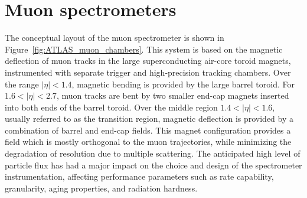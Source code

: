 \section{Muon spectrometers}
\label{sec:ATLAS_muon_chambers}

\begin{figure}
\end{figure}


The conceptual layout of the muon spectrometer is shown in Figure~\ref{fig:ATLAS_muon_chambers}. This system is based on the magnetic
deflection of muon tracks in the large superconducting air-core toroid magnets, instrumented with
separate trigger and high-precision tracking chambers. Over the range $|\eta| < 1.4$, magnetic bending
is provided by the large barrel toroid. For $1.6 < |\eta| < 2.7$, muon tracks are bent by two smaller
end-cap magnets inserted into both ends of the barrel toroid. Over the middle region $1.4 < |\eta| < 1.6$, usually referred
to as the transition region, magnetic deflection is provided by a combination of barrel and end-cap
fields. This magnet configuration provides a field which is mostly orthogonal to the muon trajectories, while minimizing the degradation of resolution due to multiple scattering. The anticipated
high level of particle flux has had a major impact on the choice and design of the spectrometer instrumentation,
affecting performance parameters such as rate capability, granularity, aging
properties, and radiation hardness.


